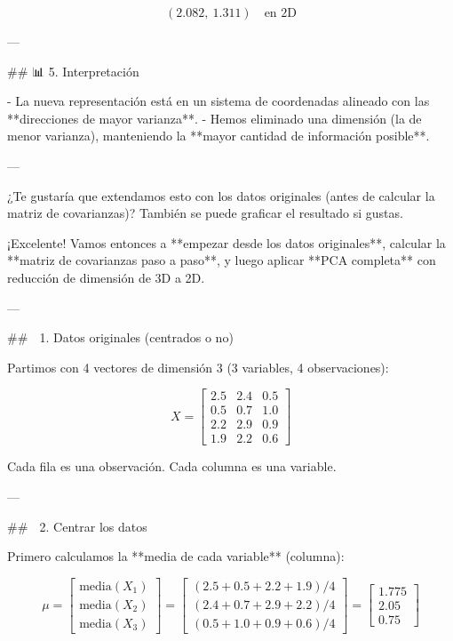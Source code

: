 \documentclass[12pt]{article} %
\begin{document}
\[
(2.082,\ 1.311) \quad \text{en 2D}
\]

---

## 📊 5. Interpretación

- La nueva representación está en un sistema de coordenadas alineado con las **direcciones de mayor varianza**.
- Hemos eliminado una dimensión (la de menor varianza), manteniendo la **mayor cantidad de información posible**.

---

¿Te gustaría que extendamos esto con los datos originales (antes de calcular la matriz de covarianzas)? También se puede graficar el resultado si gustas.


¡Excelente! Vamos entonces a **empezar desde los datos originales**, calcular la **matriz de covarianzas paso a paso**, y luego aplicar **PCA completa** con reducción de dimensión de 3D a 2D.

---

## 🔢 1. Datos originales (centrados o no)

Partimos con 4 vectores de dimensión 3 (3 variables, 4 observaciones):

\[
X =
\begin{bmatrix}
2.5 & 2.4 & 0.5 \\
0.5 & 0.7 & 1.0 \\
2.2 & 2.9 & 0.9 \\
1.9 & 2.2 & 0.6
\end{bmatrix}
\]

Cada fila es una observación. Cada columna es una variable.

---

## 🧮 2. Centrar los datos

Primero calculamos la **media de cada variable** (columna):

\[
\mu = 
\begin{bmatrix}
\text{media}(X_1) \\
\text{media}(X_2) \\
\text{media}(X_3)
\end{bmatrix}
=
\begin{bmatrix}
(2.5 + 0.5 + 2.2 + 1.9)/4 \\
(2.4 + 0.7 + 2.9 + 2.2)/4 \\
(0.5 + 1.0 + 0.9 + 0.6)/4
\end{bmatrix}
=
\begin{bmatrix}
1.775 \\
2.05 \\
0.75
\end{bmatrix}
\]
\end{document}
